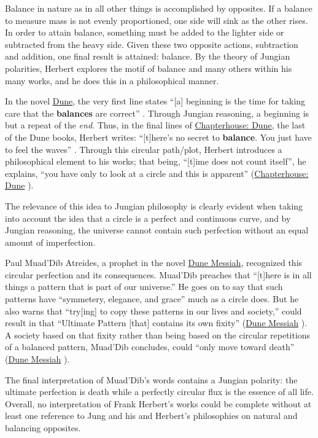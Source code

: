 \documentclass[14pt, a4paper, onecolumn]{extreport}
\renewcommand{\baselinestretch}{1.25}
\begin{document}
Balance in nature as in all other things is accomplished by opposites. If a balance to measure mass is not evenly proportioned, one side will sink as the other rises. In order to attain balance, something must be added to the lighter side or subtracted from the heavy side. Given these two opposite actions, subtraction and addition, one final result is attained: balance. By the theory of Jungian polarities, Herbert explores the motif of balance and many others within his many works, and he does this in a philosophical manner.

In the novel \underline{Dune}, the very first line states ``[a] beginning is the time for taking care that the \textbf{balances} are correct'' \cite{Dune:3}. Through Jungian reasoning, a beginning is but a repeat of the \emph{end}. Thus, in the final lines of \underline{Chapterhouse: Dune}, the last of the Dune books, Herbert writes: ``[t]here's no secret to \textbf{balance}. You just have to feel the waves'' \cite{Chapterhouse:455}. Through this circular path/plot, Herbert introduces a philosophical element to his works; that being, ``[t]ime does not count itself'', he explains, ``you have only to look at a circle and this is apparent'' (\underline{Chapterhouse: Dune} \cite{Chapterhouse:191}).

The relevance of this idea to Jungian philosophy is clearly evident when taking into account the idea that a circle is a perfect and continuous curve, and by Jungian reasoning, the universe cannot contain such perfection without an equal amount of imperfection.

Paul Muad'Dib Atreides, a prophet in the novel \underline{Dune Messiah}, recognized this circular perfection and its consequences. Muad'Dib preaches that ``[t]here is in all things a pattern that is part of our universe.'' He goes on to say that such patterns have ``symmetery, elegance, and grace'' much as a circle does. But he also warns that ``try[ing] to copy these patterns in our lives and society,'' could result in that ``Ultimate Pattern [that] contains its own fixity'' (\underline{Dune Messiah} \cite{Messiah:380}). A society based on that fixity rather than being based on the circular repetitions of a balanced pattern, Muad'Dib concludes, could ``only move toward death'' (\underline{Dune Messiah} \cite{Messiah:380}).

The final interpretation of Muad'Dib's words contains a Jungian polarity: the ultimate perfection is death while a perfectly circular flux is the essence of all life. Overall, no interpretation of Frank Herbert's works could be complete without at least one reference to Jung and his and Herbert's philosophies on natural and balancing opposites.

\newpage

\renewcommand{\baselinestretch}{1}



\end{document}
